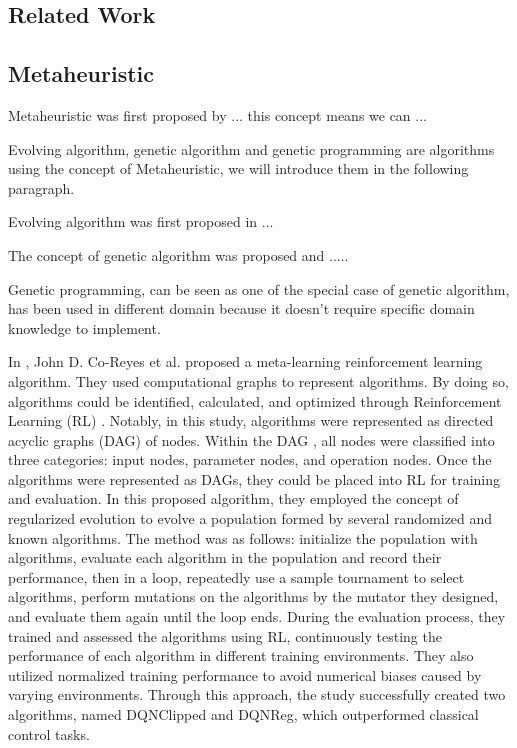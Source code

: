 \begin{ZhChapter}

    \chapter{Related Work}

    \section{Metaheuristic}
    Metaheuristic was first proposed by ... this concept means we can ...


    Evolving algorithm, genetic algorithm and genetic programming are algorithms using the concept of Metaheuristic, we will introduce them in the following paragraph.

    Evolving algorithm was first proposed in ...

    The concept of genetic algorithm was proposed and .....

    Genetic programming, can be seen as one of the special case of genetic algorithm, has been used in different domain because it doesn't require specific domain knowledge to implement.

    In \cite{coreyes2022evolvingreinforcementlearningalgorithms}, John D. Co-Reyes et al. proposed a meta-learning reinforcement learning algorithm. They used computational graphs to represent algorithms. By doing so, algorithms could be identified, calculated, and optimized through Reinforcement Learning (RL) \cite{kaelbling1996reinforcement}. Notably, in this study, algorithms were represented as directed acyclic graphs (DAG) \cite{thost2021directedacyclicgraphneural} of nodes. Within the DAG , all nodes were classified into three categories: input nodes, parameter nodes, and operation nodes. Once the algorithms were represented as DAGs, they could be placed into RL for training and evaluation. In this proposed algorithm, they employed the concept of regularized evolution \cite{real2019regularized} to evolve a population formed by several randomized and known algorithms. The method was as follows: initialize the population with algorithms, evaluate each algorithm in the population and record their performance, then in a loop, repeatedly use a sample tournament \cite{goldberg1991comparative} to select algorithms, perform mutations on the algorithms by the mutator they designed, and evaluate them again until the loop ends. During the evaluation process, they trained and assessed the algorithms using RL, continuously testing the performance of each algorithm in different training environments. They also utilized normalized training performance to avoid numerical biases caused by varying environments. Through this approach, the study successfully created two algorithms, named DQNClipped and DQNReg, which outperformed classical control tasks.


\end{ZhChapter}
